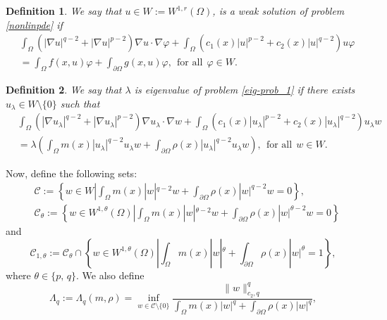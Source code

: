 \documentclass[pdflatex,sn-mathphys-num]{sn-jnl}
\theoremstyle{thmstyleone}%
\theoremstyle{thmstyletwo}%
\theoremstyle{thmstylethree}%
\newtheorem{definition}{Definition}%
\theoremstyle{thmstylethree}%
\begin{document}
\begin{definition}\label{def-sol-nonlin}
We say that  $u\in W:=W^{1, r}(\Omega)$,   is a weak solution of problem  \eqref{nonlinpde} if
\begin{align*}
    &\int_\Omega \left(|\nabla u|^{q-2}+|\nabla u|^{p-2}\right)\nabla u \cdot \nabla \varphi  +\int_\Omega \left(c_1(x)|u|^{p-2}+c_2(x)|u|^{q-2}\right) u \varphi  \nonumber\\
&=\int_\Omega f(x,u) \varphi  + \int_{\partial\Omega} g(x,u) \varphi , \ \ \text{for all}\ \ \varphi \in W. 
\end{align*}
\end{definition}

\begin{definition}\label{def_eig}
We say that $\lambda$ is eigenvalue of problem \eqref{eig-prob_1} if there exists $u_{\lambda}\in W \setminus \{0\}$ such that 
\begin{align}\label{def-eigen-1}
&\int_\Omega \left(|\nabla u_{\lambda}|^{q-2}+|\nabla u_{\lambda}|^{p-2}\right)\nabla u_{\lambda} \cdot \nabla w  +\int_\Omega \left(c_1(x)|u_{\lambda}|^{p-2}+c_2(x)|u_{\lambda}|^{q-2}\right) u_{\lambda} w \nonumber\\
&=\lambda \left( \int_\Omega m(x) |u_{\lambda}|^{q-2} u_{\lambda} w+\int_{\partial\Omega} \rho(x) |u_{\lambda}|^{q-2} u_{\lambda} w \right), \ \ \text{for all}\ \ w\in W. 
\end{align}
\end{definition}

Now,  define the following sets:
\begin{equation*}
\begin{aligned}
&\mathcal{C}:=\left\{ w\in W|  \int_\Omega m(x)|w|^{q-2}w+ \int_{\partial\Omega} \rho(x)|w|^{q-2}w=0 \right\},
\\
&\mathcal{C}_{\theta}:=\left\{ w\in W^{1,\theta}(\Omega)|  \int_\Omega m(x)|w|^{\theta-2}w+ \int_{\partial\Omega} \rho(x)|w|^{\theta-2}w=0 \right\}
\end{aligned}
\end{equation*}
and
\begin{equation}\label{def_C_1r} \mathcal{C}_{1,\theta }:=\mathcal{C}_\theta\cap \left\{ w\in W^{1,\theta}(\Omega)|  \int_\Omega m(x)|w|^\theta+ \int_{\partial\Omega} \rho(x)|w|^\theta=1 \right\},
\end{equation}
where $\theta \in \{p,\, q\}$. We also define
\begin{equation}\label{Lambda_q}
\Lambda_q:= \Lambda_q(m,\rho)=\inf_{w \in \mathcal{C} \setminus \{0\}} \frac{\|w\|_{c_2,q}^q}{\int_\Omega m(x)|w|^{q}+ \int_{\partial\Omega} \rho(x)|w|^{q}},
\end{equation}
\end{document}
